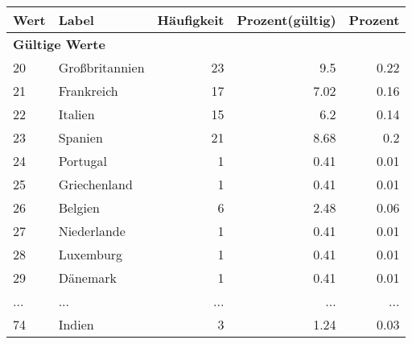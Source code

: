      \begin{longtable}{lXrrr}
     \toprule
     \textbf{Wert} & \textbf{Label} & \textbf{Häufigkeit} & \textbf{Prozent(gültig)} & \textbf{Prozent} \\
     \endhead
     \midrule
     \multicolumn{5}{l}{\textbf{Gültige Werte}}\\
        20 & \multicolumn{1}{X}{Großbritannien} & %
          \num{23} &
          \num[round-mode=places,round-precision=2]{9,5} &
          \num[round-mode=places,round-precision=2]{0,22} \\
        21 & \multicolumn{1}{X}{Frankreich} & %
          \num{17} &
          \num[round-mode=places,round-precision=2]{7,02} &
          \num[round-mode=places,round-precision=2]{0,16} \\
        22 & \multicolumn{1}{X}{Italien} & %
          \num{15} &
          \num[round-mode=places,round-precision=2]{6,2} &
          \num[round-mode=places,round-precision=2]{0,14} \\
        23 & \multicolumn{1}{X}{Spanien} & %
          \num{21} &
          \num[round-mode=places,round-precision=2]{8,68} &
          \num[round-mode=places,round-precision=2]{0,2} \\
        24 & \multicolumn{1}{X}{Portugal} & %
          \num{1} &
          \num[round-mode=places,round-precision=2]{0,41} &
          \num[round-mode=places,round-precision=2]{0,01} \\
        25 & \multicolumn{1}{X}{Griechenland} & %
          \num{1} &
          \num[round-mode=places,round-precision=2]{0,41} &
          \num[round-mode=places,round-precision=2]{0,01} \\
        26 & \multicolumn{1}{X}{Belgien} & %
          \num{6} &
          \num[round-mode=places,round-precision=2]{2,48} &
          \num[round-mode=places,round-precision=2]{0,06} \\
        27 & \multicolumn{1}{X}{Niederlande} & %
          \num{1} &
          \num[round-mode=places,round-precision=2]{0,41} &
          \num[round-mode=places,round-precision=2]{0,01} \\
        28 & \multicolumn{1}{X}{Luxemburg} & %
          \num{1} &
          \num[round-mode=places,round-precision=2]{0,41} &
          \num[round-mode=places,round-precision=2]{0,01} \\
        29 & \multicolumn{1}{X}{Dänemark} & %
          \num{1} &
          \num[round-mode=places,round-precision=2]{0,41} &
          \num[round-mode=places,round-precision=2]{0,01} \\
       ... & ... & ... & ... & ... \\
        74 & \multicolumn{1}{X}{Indien} & %
          \num{3} &
          \num[round-mode=places,round-precision=2]{1,24} &
          \num[round-mode=places,round-precision=2]{0,03} \\


\end{longtable}
